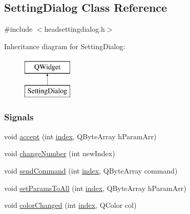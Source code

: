 \hypertarget{classSettingDialog}{}\subsection{Setting\+Dialog Class Reference}
\label{classSettingDialog}


{\ttfamily \#include $<$headsettingdialog.\+h$>$}

Inheritance diagram for Setting\+Dialog\+:\begin{figure}[H]
\begin{center}
\leavevmode
\includegraphics[height=2.000000cm]{classSettingDialog}
\end{center}
\end{figure}
\subsubsection*{Signals}
\begin{DoxyCompactItemize}
\item 
void \mbox{\hyperlink{classSettingDialog_abaf35d57bd061500e4d06c86bd9b7373}{accept}} (int \mbox{\hyperlink{classSettingDialog_a293670a08207442bb9ab04a734b70d33}{index}}, Q\+Byte\+Array h\+Param\+Arr)
\item 
void \mbox{\hyperlink{classSettingDialog_aaec8f3ce53ff211c0d2a3ebace6a4120}{change\+Number}} (int new\+Index)
\item 
void \mbox{\hyperlink{classSettingDialog_a88624538f0c2940ca17787bc797d695f}{send\+Command}} (int \mbox{\hyperlink{classSettingDialog_a293670a08207442bb9ab04a734b70d33}{index}}, Q\+Byte\+Array command)
\item 
void \mbox{\hyperlink{classSettingDialog_a3d2a5649a7c33127df571fef48c68744}{set\+Params\+To\+All}} (int \mbox{\hyperlink{classSettingDialog_a293670a08207442bb9ab04a734b70d33}{index}}, Q\+Byte\+Array h\+Param\+Arr)
\item 
void \mbox{\hyperlink{classSettingDialog_aa1a997bd3c53719f9d94a8c637d0a3e9}{color\+Changed}} (int \mbox{\hyperlink{classSettingDialog_a293670a08207442bb9ab04a734b70d33}{index}}, Q\+Color col)
\end{DoxyCompactItemize}
